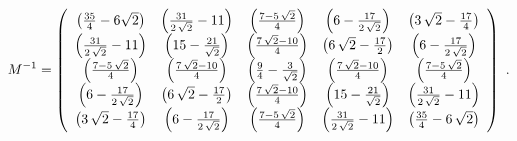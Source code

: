 \begin{equation}
M^{-1}=\left( 
\begin{array}{ccccc}
\left( \frac{35}{4}-6\sqrt{2}\right) & \left( {\frac{31}{2\,\sqrt{2}}}%
-11\right) & \left( {\frac{7-5\,\sqrt{2}}{4}}\right) & \left( 6-{\frac{17}{%
2\,\sqrt{2}}}\right) & \left( 3\,\sqrt{2}-{\frac{17}{4}}\right) \\ 
\left( {\frac{31}{2\,\sqrt{2}}}-11\right) & \left( 15-{\frac{21}{\sqrt{2}}}%
\right) & \left( {\frac{7\,\sqrt{2}-10}{4}}\right) & \left( 6\,\sqrt{2}-{%
\frac{17}{2}}\right) & \left( 6-{\frac{17}{2\,\sqrt{2}}}\right) \\ 
\left( {\frac{7-5\,\sqrt{2}}{4}}\right) & \left( {\frac{7\,\sqrt{2}-10}{4}}%
\right) & \left( {\frac{9}{4}}-{\frac{3}{\sqrt{2}}}\right) & \left( {\frac{%
7\,\sqrt{2}-10}{4}}\right) & \left( {\frac{7-5\,\sqrt{2}}{4}}\right) \\ 
\left( 6-{\frac{17}{2\,\sqrt{2}}}\right) & \left( 6\,\sqrt{2}-{\frac{17}{2}}%
\right) & \left( {\frac{7\,\sqrt{2}-10}{4}}\right) & \left( 15-{\frac{21}{%
\sqrt{2}}}\right) & \left( {\frac{31}{2\,\sqrt{2}}}-11\right) \\ 
\left( 3\,\sqrt{2}-{\frac{17}{4}}\right) & \left( 6-{\frac{17}{2\,\sqrt{2}}}%
\right) & \left( {\frac{7-5\,\sqrt{2}}{4}}\right) & \left( {\frac{31}{2\,%
\sqrt{2}}}-11\right) & \left( {\frac{35}{4}}-6\,\sqrt{2}\right)%
\end{array}
\right) ~.  \label{M5}
\end{equation}

